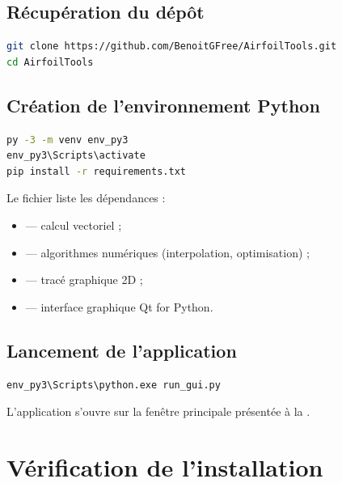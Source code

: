 \subsection{Récupération du dépôt}

\begin{lstlisting}[language=bash,caption={Clonage du dépôt}]
git clone https://github.com/BenoitGFree/AirfoilTools.git
cd AirfoilTools
\end{lstlisting}

\subsection{Création de l'environnement Python}

\begin{lstlisting}[language=bash,caption={Création du venv et installation
des dépendances (Windows)}]
py -3 -m venv env_py3
env_py3\Scripts\activate
pip install -r requirements.txt
\end{lstlisting}

Le fichier  liste les dépendances :

\begin{itemize}
    \item {} --- calcul vectoriel ;
    \item {} --- algorithmes numériques (interpolation,
        optimisation) ;
    \item {} --- tracé graphique 2D ;
    \item {} --- interface graphique Qt for Python.
\end{itemize}

\subsection{Lancement de l'application}

\begin{lstlisting}[language=bash,caption={Démarrage de la GUI}]
env_py3\Scripts\python.exe run_gui.py
\end{lstlisting}

L'application s'ouvre sur la fenêtre principale présentée à la
.

\section{Vérification de l'installation}

